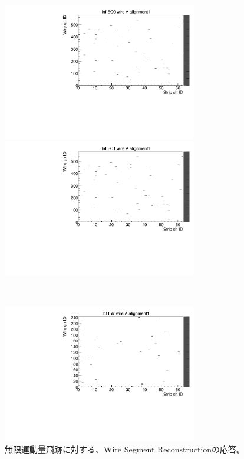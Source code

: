 \begin{figure}
    \begin{minipage}[b]{.5\linewidth}
        \centering
        \includegraphics[height=6cm]{fig/Test/A_InfEC0_wire.pdf}
    \end{minipage}
    \begin{minipage}[b]{.5\linewidth}
        \centering
        \includegraphics[height=6cm]{fig/Test/A_InfEC1_wire.pdf}
    \end{minipage}\\
    \begin{minipage}[b]{\linewidth}
        \centering
        \includegraphics[height=6cm]{fig/Test/A_InfFW_wire.pdf}
    \end{minipage}
    \caption[異なる画像形式の比較]{無限運動量飛跡に対する、Wire Segment Reconstructionの応答。}
    \label{Inf_A_Wire}
\end{figure}


